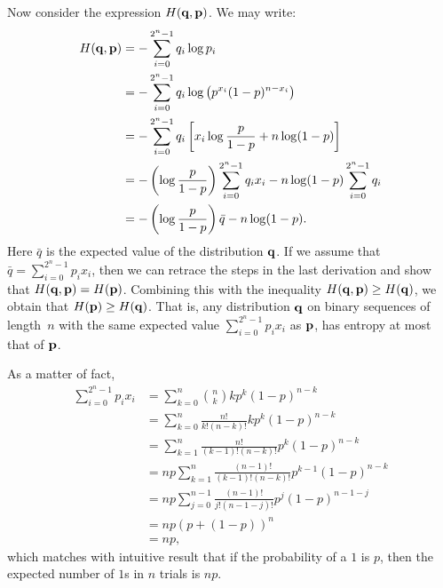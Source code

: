 Now consider the expression $H(\mathbf{q}, \mathbf{p})$. We may write:
\begin{align*}
    H(\mathbf{q}, \mathbf{p}) & = - \sum_{i = 0}^{2^n - 1} q_i \log p_i \\
        & = - \sum_{i = 0}^{2^n - 1} q_i \log \left ( p^{x_i} (1 - p)^{n - x_i} \right ) \\
        & = - \sum_{i = 0}^{2^n - 1} q_i \left [ x_i \log \frac{p}{1 - p} + n \log (1 - p) \right ] \\
        & = - \left ( \log \frac{p}{1 - p} \right ) \sum_{i = 0}^{2^n - 1} q_i x_i - n \log (1 - p) \sum_{i = 0}^{2^n - 1} q_i \\
        & = - \left ( \log \frac{p}{1 - p} \right ) \bar{q} - n \log (1 - p).
\end{align*}
Here $\bar{q}$ is the expected value of the distribution $\mathbf{q}$. If we assume that
$\bar{q} = \sum_{i = 0}^{2^n - 1} p_i x_i$, then we can retrace
the steps in the last derivation and show that $H(\mathbf{q}, \mathbf{p}) = H(\mathbf{p})$. Combining this with the
inequality $H(\mathbf{q}, \mathbf{p}) \geq H(\mathbf{q})$, we obtain that $H(\mathbf{p}) \geq H(\mathbf{q})$. That is, any
distribution $\mathbf{q}$ on binary sequences of length~$n$ with the same expected value $\sum_{i = 0}^{2^n - 1} p_i x_i$
as $\mathbf{p}$, has entropy at most that of $\mathbf{p}$.

As a matter of fact,
\begin{align*}
    \sum_{i = 0}^{2^n - 1} p_i x_i
        & = \sum_{k = 0}^{n} {n \choose k} k p^k (1 - p)^{n - k} \\
        & = \sum_{k = 0}^{n} \frac{n!}{k! (n - k)!} k p^k (1 - p)^{n - k} \\
        & = \sum_{k = 1}^{n} \frac{n!}{(k - 1)! (n - k)!} p^k (1 - p)^{n - k} \\
        & = np \sum_{k = 1}^{n} \frac{(n - 1)!}{(k - 1)! (n - k)!} p^{k - 1} (1 - p)^{n - k} \\
        & =  np \sum_{j = 0}^{n - 1} \frac{(n - 1)!}{j! (n - 1 - j)!} p^{j} (1 - p)^{n - 1 - j} \\
        & = np \left ( p + (1 - p) \right )^n \\
        & = np,
\end{align*}
which matches with intuitive result that if the probability of a $1$ is $p$, then the expected
number of $1$s in $n$ trials is $np$.
